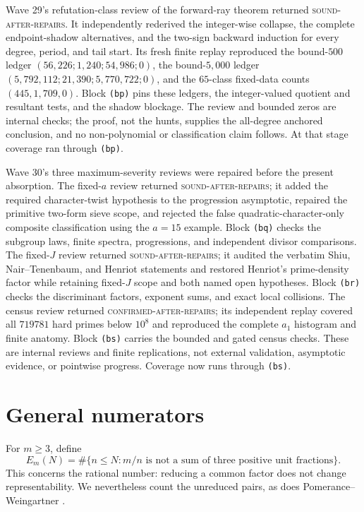 \documentclass[10pt,reqno]{amsart}
\theoremstyle{definition}
\newcommand{\1}{\mathbf 1}
\begin{document}
Wave 29's refutation-class review of the forward-ray theorem returned
\textsc{sound-after-repairs}.  It independently rederived the integer-wise
collapse, the complete endpoint-shadow alternatives, and the two-sign
backward induction for every degree, period, and tail start.  Its fresh
finite replay reproduced the bound-$500$ ledger
$(56{,}226;1{,}240;54{,}986;0)$, the bound-$5{,}000$ ledger
$(5{,}792{,}112;21{,}390;5{,}770{,}722;0)$, and the $65$-class fixed-data
counts $(445,1{,}709,0)$.  Block \texttt{(bp)} pins these ledgers, the
integer-valued quotient and resultant tests, and the shadow blockage.  The
review and bounded zeros are internal checks; the proof, not the hunts,
supplies the all-degree anchored conclusion, and no non-polynomial or
classification claim follows.  At that stage coverage ran through
\texttt{(bp)}.

Wave 30's three maximum-severity reviews were repaired before the present
absorption.  The fixed-$a$ review returned \textsc{sound-after-repairs}; it
added the required character-twist hypothesis to the progression asymptotic,
repaired the primitive two-form sieve scope, and rejected the false
quadratic-character-only composite classification using the $a=15$
example.  Block \texttt{(bq)} checks the subgroup laws, finite spectra,
progressions, and independent divisor comparisons.  The fixed-$J$ review
returned \textsc{sound-after-repairs}; it audited the verbatim Shiu,
Nair--Tenenbaum, and Henriot statements and restored Henriot's prime-density
factor while retaining fixed-$J$ scope and both named open hypotheses.
Block \texttt{(br)} checks the discriminant factors, exponent sums, and
exact local collisions.  The census review returned
\textsc{confirmed-after-repairs}; its independent replay covered all
$719781$ hard primes below $10^8$ and reproduced the complete $a_1$
histogram and finite anatomy.  Block \texttt{(bs)} carries the bounded and
gated census checks.  These are internal reviews and finite replications,
not external validation, asymptotic evidence, or pointwise progress.
Coverage now runs through \texttt{(bs)}.

\section{General numerators}\label{sec:general-m}
For $m\geq3$, define
\begin{equation}\tag{43.1}
 E_m(N)=\#\{n\leq N:m/n\text{ is not a sum of three positive unit
 fractions}\}.
\end{equation}
This concerns the rational number: reducing a common factor does not change
representability.  We nevertheless count the unreduced pairs, as does
Pomerance--Weingartner \cite{PomeranceWeingartner}.
\end{document}
